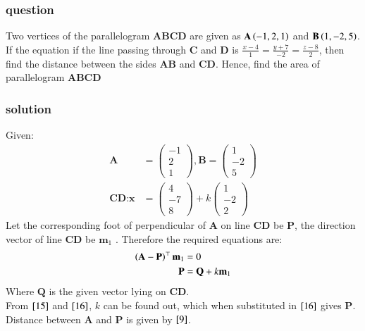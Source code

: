 \documentclass[journal,12pt,onecolumn]{IEEEtran}
\theoremstyle{remark}
\begin{document}
\subsubsection{question}
Two vertices of the parallelogram $\textbf{ABCD}$ are given as $\textbf{A}\left(-1,2,1\right)$ and $\textbf{B}\left(1,-2,5\right)$. If the equation if the line passing through $\textbf{C}$ and $\textbf{D}$ is $\frac{x-4}{1} = \frac{y+7}{-2} = \frac{z-8}{2}$, then find the distance between the sides $\textbf{AB}$ and $\textbf{CD}$. Hence, find the area of parallelogram $\textbf{ABCD}$
\subsubsection{solution}
Given:
\begin{align}
    \textbf{A} &= \begin{pmatrix}
        -1\\
        2\\
        1
    \end{pmatrix},
    \textbf{B} = \begin{pmatrix}
        1\\
        -2\\
        5
    \end{pmatrix}\\
    \textbf{CD}:\textbf{x} &= \begin{pmatrix}
        4\\
        -7\\
        8
    \end{pmatrix}
    +k\begin{pmatrix}
        1\\
        -2\\
        2
    \end{pmatrix}
\end{align}
Let the corresponding foot of perpendicular of $\textbf{A}$ on line $\textbf{CD}$ be $\textbf{P}$, the direction vector of line $\textbf{CD}$ be $\textbf{m}_1$ . Therefore the required equations are:
\begin{align}
    \left(\textbf{A}-\textbf{P}\right)^{\top} \textbf{m}_1 &= 0 \label{15}\\
    \textbf{P} &= \textbf{Q} + k\textbf{m}_1 \label{16}
\end{align}
Where $\textbf{Q}$ is the given vector lying on $\textbf{CD}$.\\
From $\eqref{15}$ and $\eqref{16}$, $k$ can be found out, which when substituted in $\eqref{16}$ gives $\textbf{P}$. Distance between $\textbf{A}$ and $\textbf{P}$ is given by $\eqref{9}$.
\end{document}
